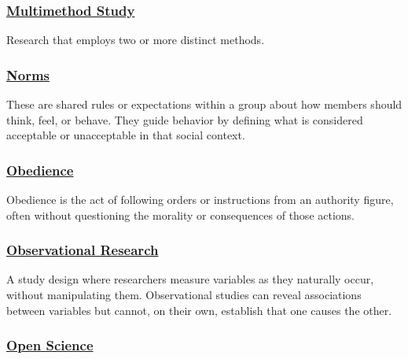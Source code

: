 \documentclass[
  letterpaper,
]{book}
\begin{document}
\subsubsection*{\texorpdfstring{\hyperref[def-multimethodstudy]{Multimethod
Study}}{Multimethod Study}}\label{multimethod-study}

Research that employs two or more distinct methods.

\subsubsection*{\texorpdfstring{\hyperref[def-norms]{Norms}}{Norms}}\label{norms}

These are shared rules or expectations within a group about how members
should think, feel, or behave. They guide behavior by defining what is
considered acceptable or unacceptable in that social context.

\subsubsection*{\texorpdfstring{\hyperref[def-obedience]{Obedience}}{Obedience}}\label{obedience}

Obedience is the act of following orders or instructions from an
authority figure, often without questioning the morality or consequences
of those actions.

\subsubsection*{\texorpdfstring{\hyperref[def-observationalresearch]{Observational
Research}}{Observational Research}}\label{observational-research}

A study design where researchers measure variables as they naturally
occur, without manipulating them. Observational studies can reveal
associations between variables but cannot, on their own, establish that
one causes the other.

\subsubsection*{\texorpdfstring{\hyperref[def-openscience]{Open
Science}}{Open Science}}\label{open-science}
\end{document}
